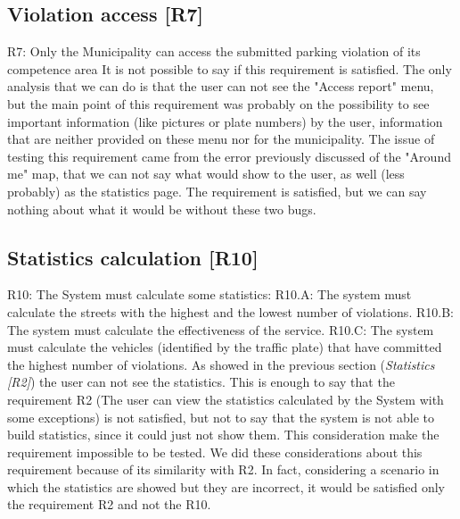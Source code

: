 \documentclass[../ATD.tex]{subfiles}
\begin{document}
    \subsection{Violation access [R7]}\label{subsec:violation-access}
    R7: Only the Municipality can access the submitted parking violation of its competence area
    \newline
    It is not possible to say if this requirement is satisfied.
    The only analysis that we can do is that the user can not see the "Access report" menu, but the main point of this requirement was probably on the possibility to see important information (like pictures or plate numbers) by the user, information that are neither provided on these menu nor for the municipality.
    The issue of testing this requirement came from the error previously discussed of the "Around me" map, that we can not say what would show to the user, as well (less probably) as the statistics page.
    The requirement is satisfied, but we can say nothing about what it would be without these two bugs.

    \subsection{Statistics calculation [R10]}\label{subsec:statistics-calculation}
    R10: The System must calculate some statistics:
    \newline
    R10.A: The system must calculate the streets with the highest and the lowest number of violations.
    \newline
    R10.B: The system must calculate the effectiveness of the service.
    \newline
    R10.C: The system must calculate the vehicles (identified by the traffic plate) that have committed the highest number of violations.
    \newline
    As showed in the previous section (\textit{Statistics [R2]}) the user can not see the statistics.
    This is enough to say that the requirement R2 (The user can view the statistics calculated by the System with some exceptions) is not satisfied, but not to say that the system is not able to build statistics, since it could just not show them.
    This consideration make the requirement impossible to be tested.
    \newline
    We did these considerations about this requirement because of its similarity with R2.
    In fact, considering a scenario in which the statistics are showed but they are incorrect, it would be satisfied only the requirement R2 and not the R10.
\end{document}

